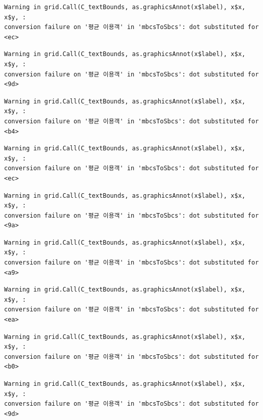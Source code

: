 \documentclass[
  letterpaper,
  DIV=11,
  numbers=noendperiod]{scrreprt}
\begin{document}
\begin{verbatim}
Warning in grid.Call(C_textBounds, as.graphicsAnnot(x$label), x$x, x$y, :
conversion failure on '평균 이용객' in 'mbcsToSbcs': dot substituted for <ec>
\end{verbatim}

\begin{verbatim}
Warning in grid.Call(C_textBounds, as.graphicsAnnot(x$label), x$x, x$y, :
conversion failure on '평균 이용객' in 'mbcsToSbcs': dot substituted for <9d>
\end{verbatim}

\begin{verbatim}
Warning in grid.Call(C_textBounds, as.graphicsAnnot(x$label), x$x, x$y, :
conversion failure on '평균 이용객' in 'mbcsToSbcs': dot substituted for <b4>
\end{verbatim}

\begin{verbatim}
Warning in grid.Call(C_textBounds, as.graphicsAnnot(x$label), x$x, x$y, :
conversion failure on '평균 이용객' in 'mbcsToSbcs': dot substituted for <ec>
\end{verbatim}

\begin{verbatim}
Warning in grid.Call(C_textBounds, as.graphicsAnnot(x$label), x$x, x$y, :
conversion failure on '평균 이용객' in 'mbcsToSbcs': dot substituted for <9a>
\end{verbatim}

\begin{verbatim}
Warning in grid.Call(C_textBounds, as.graphicsAnnot(x$label), x$x, x$y, :
conversion failure on '평균 이용객' in 'mbcsToSbcs': dot substituted for <a9>
\end{verbatim}

\begin{verbatim}
Warning in grid.Call(C_textBounds, as.graphicsAnnot(x$label), x$x, x$y, :
conversion failure on '평균 이용객' in 'mbcsToSbcs': dot substituted for <ea>
\end{verbatim}

\begin{verbatim}
Warning in grid.Call(C_textBounds, as.graphicsAnnot(x$label), x$x, x$y, :
conversion failure on '평균 이용객' in 'mbcsToSbcs': dot substituted for <b0>
\end{verbatim}

\begin{verbatim}
Warning in grid.Call(C_textBounds, as.graphicsAnnot(x$label), x$x, x$y, :
conversion failure on '평균 이용객' in 'mbcsToSbcs': dot substituted for <9d>
\end{verbatim}
\end{document}

